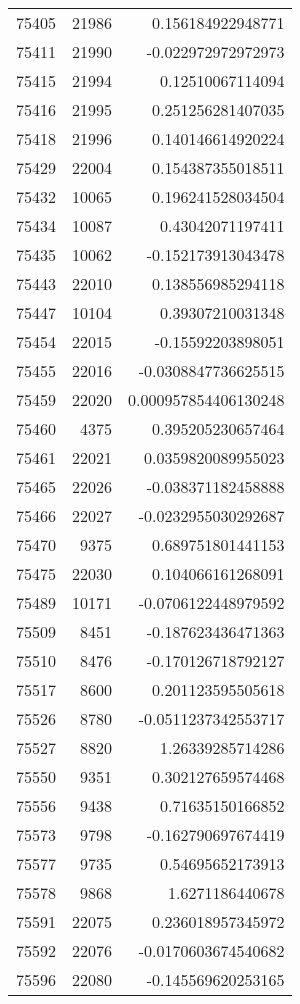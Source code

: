\begin{tabular}{r | r | r}
75405 & 21986 & 0.156184922948771 \\
75411 & 21990 & -0.022972972972973 \\
75415 & 21994 & 0.12510067114094 \\
75416 & 21995 & 0.251256281407035 \\
75418 & 21996 & 0.140146614920224 \\
75429 & 22004 & 0.154387355018511 \\
75432 & 10065 & 0.196241528034504 \\
75434 & 10087 & 0.43042071197411 \\
75435 & 10062 & -0.152173913043478 \\
75443 & 22010 & 0.138556985294118 \\
75447 & 10104 & 0.39307210031348 \\
75454 & 22015 & -0.15592203898051 \\
75455 & 22016 & -0.0308847736625515 \\
75459 & 22020 & 0.000957854406130248 \\
75460 & 4375 & 0.395205230657464 \\
75461 & 22021 & 0.0359820089955023 \\
75465 & 22026 & -0.038371182458888 \\
75466 & 22027 & -0.0232955030292687 \\
75470 & 9375 & 0.689751801441153 \\
75475 & 22030 & 0.104066161268091 \\
75489 & 10171 & -0.0706122448979592 \\
75509 & 8451 & -0.187623436471363 \\
75510 & 8476 & -0.170126718792127 \\
75517 & 8600 & 0.201123595505618 \\
75526 & 8780 & -0.0511237342553717 \\
75527 & 8820 & 1.26339285714286 \\
75550 & 9351 & 0.302127659574468 \\
75556 & 9438 & 0.71635150166852 \\
75573 & 9798 & -0.162790697674419 \\
75577 & 9735 & 0.54695652173913 \\
75578 & 9868 & 1.6271186440678 \\
75591 & 22075 & 0.236018957345972 \\
75592 & 22076 & -0.0170603674540682 \\
75596 & 22080 & -0.145569620253165 \\

\end{tabular}
